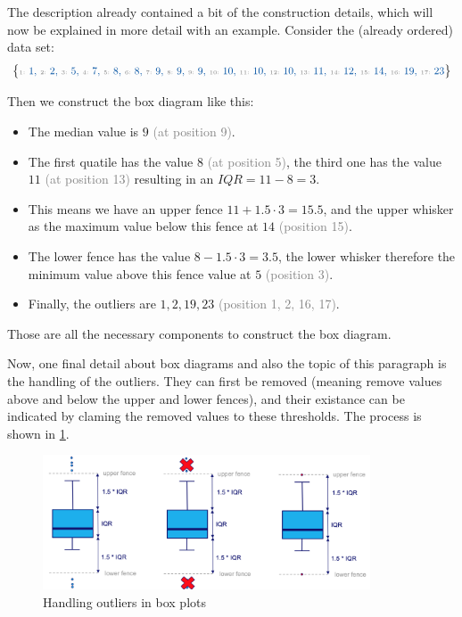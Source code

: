 The description already contained a bit of the construction details, which will now be explained in more detail with an example. Consider the (already ordered) data set:
\begin{align*}
  \big\{
  \text{\textcolor{mathblue}{\small {\tiny \color{gray} 1: }1, {\tiny \color{gray} 2: }2, {\tiny \color{gray} 3: }5, {\tiny \color{gray} 4: }7, {\tiny \color{gray} 5: }8, {\tiny \color{gray} 6: }8, {\tiny \color{gray} 7: }9, {\tiny \color{gray} 8: }9, {\tiny \color{gray} 9: }9, {\tiny \color{gray} 10: }10, {\tiny \color{gray} 11: }10, {\tiny \color{gray} 12: }10, {\tiny \color{gray} 13: }11, {\tiny \color{gray} 14: }12, {\tiny \color{gray} 15: }14, {\tiny \color{gray} 16: }19, {\tiny \color{gray} 17: }23}}
  \big\}
\end{align*}
 
Then we construct the box diagram like this:
\begin{itemize}
  \item The median value is $9$ \textcolor{gray}{\tiny(at position 9)}.
  \item The first quatile has the value $8$ \textcolor{gray}{\tiny(at position 5)}, the third one has the value $11$ \textcolor{gray}{\tiny(at position 13)} resulting in an $IQR = 11-8 = 3$.
  \item This means we have an upper fence $11 + 1.5\cdot3 = 15.5$, and the upper whisker as the maximum value below this fence at $14$ \textcolor{gray}{\tiny(position 15)}.
  \item The lower fence has the value $8 - 1.5\cdot3 = 3.5$, the lower whisker therefore the minimum value above this fence value at $5$ \textcolor{gray}{\tiny(position 3)}.
  \item Finally, the outliers are $1, 2, 19, 23$ \textcolor{gray}{\tiny(position 1, 2, 16, 17)}.
\end{itemize}
Those are all the necessary components to construct the box diagram.

Now, one final detail about box diagrams and also the topic of this paragraph is the handling of the outliers. They can first be removed (meaning remove values above and below the upper and lower fences), and their existance can be indicated by claming the removed values to these thresholds. The process is shown in \ref{fig:2_box_plot_outlier_handling}.

\begin{figure}[h]
  \centering
  \includegraphics[height=4cm]{assets/visualization_and_extraction/box_outliers.png}
  \caption{Handling outliers in box plots}
  \label{fig:2_box_plot_outlier_handling}
\end{figure}